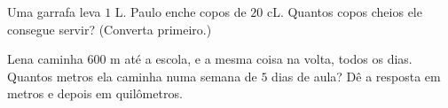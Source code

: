 \begin{exercise}[$\star\star$]\label{exo:g3:measure:10}
Uma garrafa leva $1$ L. Paulo enche copos de $20$ cL. Quantos copos
cheios ele consegue servir? (Converta primeiro.)
\end{exercise}

\begin{exercise}[$\star\star$]\label{exo:g3:measure:11}
Lena caminha $600$ m até a escola, e a mesma coisa na volta, todos os
dias. Quantos metros ela caminha numa semana de $5$ dias de aula? Dê
a resposta em metros e depois em quilômetros.
\end{exercise}
